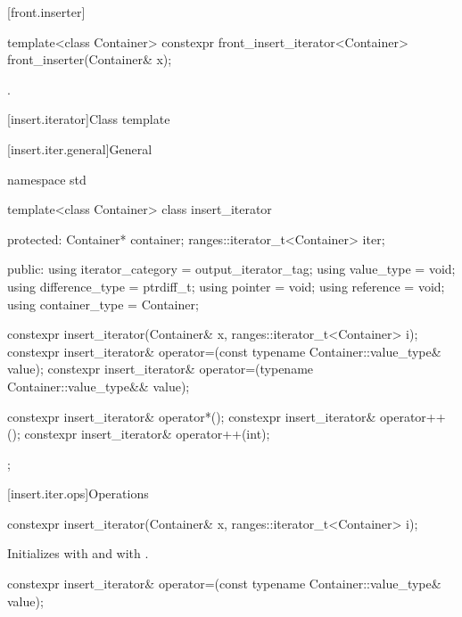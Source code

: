 [front.inserter]{}

%
\begin{itemdecl}
template<class Container>
  constexpr front_insert_iterator<Container> front_inserter(Container& x);
\end{itemdecl}

\begin{itemdescr}
\pnum
\returns
{}.
\end{itemdescr}

[insert.iterator]{Class template }

[insert.iter.general]{General}

%
\begin{codeblock}
namespace std {
  template<class Container>
  class insert_iterator {
  protected:
    Container* container;
    ranges::iterator_t<Container> iter;

  public:
    using iterator_category = output_iterator_tag;
    using value_type        = void;
    using difference_type   = ptrdiff_t;
    using pointer           = void;
    using reference         = void;
    using container_type    = Container;

    constexpr insert_iterator(Container& x, ranges::iterator_t<Container> i);
    constexpr insert_iterator& operator=(const typename Container::value_type& value);
    constexpr insert_iterator& operator=(typename Container::value_type&& value);

    constexpr insert_iterator& operator*();
    constexpr insert_iterator& operator++();
    constexpr insert_iterator& operator++(int);
  };
}
\end{codeblock}

[insert.iter.ops]{Operations}

%
\begin{itemdecl}
constexpr insert_iterator(Container& x, ranges::iterator_t<Container> i);
\end{itemdecl}

\begin{itemdescr}
\pnum
\effects
Initializes
with  and
with .
\end{itemdescr}

%
\begin{itemdecl}
constexpr insert_iterator& operator=(const typename Container::value_type& value);
\end{itemdecl}

